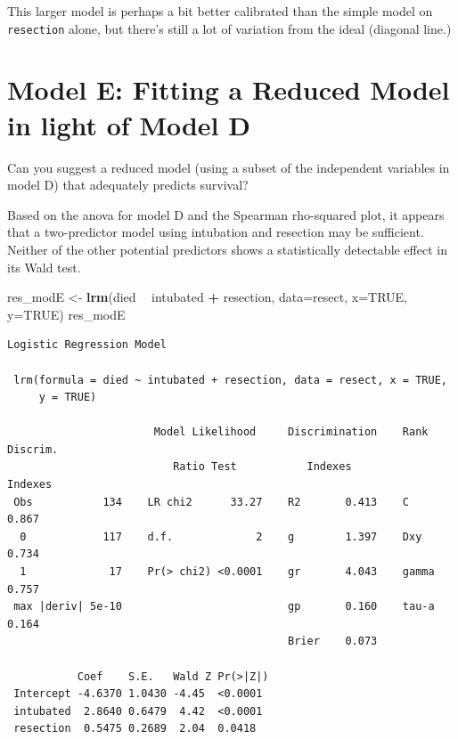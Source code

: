 \documentclass[]{book}
\newenvironment{Shaded}{\begin{snugshade}}{\end{snugshade}}
\newcommand{\KeywordTok}[1]{\textcolor[rgb]{0.13,0.29,0.53}{\textbf{#1}}}
\newcommand{\DataTypeTok}[1]{\textcolor[rgb]{0.13,0.29,0.53}{#1}}
\newcommand{\StringTok}[1]{\textcolor[rgb]{0.31,0.60,0.02}{#1}}
\newcommand{\OtherTok}[1]{\textcolor[rgb]{0.56,0.35,0.01}{#1}}
\newcommand{\OperatorTok}[1]{\textcolor[rgb]{0.81,0.36,0.00}{\textbf{#1}}}
\newcommand{\NormalTok}[1]{#1}
\theoremstyle{definition}
\theoremstyle{definition}
\theoremstyle{definition}
\theoremstyle{remark}
\begin{document}
This larger model is perhaps a bit better calibrated than the simple
model on \texttt{resection} alone, but there's still a lot of variation
from the ideal (diagonal line.)

\section{Model E: Fitting a Reduced Model in light of Model
D}\label{model-e-fitting-a-reduced-model-in-light-of-model-d}

Can you suggest a reduced model (using a subset of the independent
variables in model D) that adequately predicts survival?

Based on the anova for model D and the Spearman rho-squared plot, it
appears that a two-predictor model using intubation and resection may be
sufficient. Neither of the other potential predictors shows a
statistically detectable effect in its Wald test.

\begin{Shaded}
\begin{Highlighting}[]
\NormalTok{res_modE <-}\StringTok{ }\KeywordTok{lrm}\NormalTok{(died }\OperatorTok{~}\StringTok{ }\NormalTok{intubated }\OperatorTok{+}\StringTok{ }\NormalTok{resection, }\DataTypeTok{data=}\NormalTok{resect, }
                \DataTypeTok{x=}\OtherTok{TRUE}\NormalTok{, }\DataTypeTok{y=}\OtherTok{TRUE}\NormalTok{)}
\NormalTok{res_modE}
\end{Highlighting}
\end{Shaded}

\begin{verbatim}
Logistic Regression Model
 
 lrm(formula = died ~ intubated + resection, data = resect, x = TRUE, 
     y = TRUE)
 
                       Model Likelihood     Discrimination    Rank Discrim.    
                          Ratio Test           Indexes           Indexes       
 Obs           134    LR chi2      33.27    R2       0.413    C       0.867    
  0            117    d.f.             2    g        1.397    Dxy     0.734    
  1             17    Pr(> chi2) <0.0001    gr       4.043    gamma   0.757    
 max |deriv| 5e-10                          gp       0.160    tau-a   0.164    
                                            Brier    0.073                     
 
           Coef    S.E.   Wald Z Pr(>|Z|)
 Intercept -4.6370 1.0430 -4.45  <0.0001 
 intubated  2.8640 0.6479  4.42  <0.0001 
 resection  0.5475 0.2689  2.04  0.0418  
 
\end{verbatim}
\end{document}
